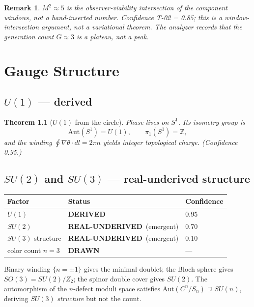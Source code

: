 \documentclass[11pt,twoside]{book}
\newtheorem{theorem}{Theorem}[chapter]
\newtheorem{remark}[theorem]{Remark}
\newcommand{\derived}{\textbf{DERIVED}}
\newcommand{\realunder}{\textbf{REAL-UNDERIVED}}
\newcommand{\drawn}{\textbf{DRAWN}}
\begin{document}
\begin{remark}
$M^2\approx5$ is the observer-viability \emph{intersection} of the component windows, not a
hand-inserted number. Confidence T-02 = 0.85; this is a window-intersection argument, not a
variational theorem. The analyzer records that the generation count $G\approx3$ is a
\emph{plateau}, not a peak.
\end{remark}


\chapter{Gauge Structure}
\label{ch:gauge}

\section{$U(1)$ — derived}

\begin{theorem}[$U(1)$ from the circle]
Phase lives on $S^1$. Its isometry group is
\begin{equation}
\mathrm{Aut}(S^1) = U(1), \qquad \pi_1(S^1) = \mathbb{Z},
\end{equation}
and the winding $\oint\nabla\theta\cdot dl = 2\pi n$ yields integer topological charge.
(Confidence 0.95.)
\end{theorem}

\section{$SU(2)$ and $SU(3)$ — real-underived structure}

\begin{center}
\begin{tabular}{lll}
\toprule
Factor & Status & Confidence \\
\midrule
$U(1)$ & \derived & 0.95 \\
$SU(2)$ & \realunder\ (emergent) & 0.70 \\
$SU(3)$ structure & \realunder\ (emergent) & 0.10 \\
color count $n=3$ & \drawn & — \\
\bottomrule
\end{tabular}
\end{center}

Binary winding $\{n=\pm1\}$ gives the minimal doublet; the Bloch sphere gives
$SO(3)=SU(2)/Z_2$; the spinor double cover gives $SU(2)$. The automorphism of the
$n$-defect moduli space satisfies $\mathrm{Aut}(C^n/S_n)\supseteq SU(n)$, deriving
$SU(3)$ \emph{structure} but not the count.
\end{document}
